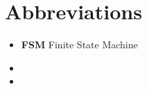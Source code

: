 

\section*{Abbreviations}
\begin{itemize}
    \item[] \textbf{FSM} Finite State Machine 
    \item[] 
    \item[]
\end{itemize}

\newpage